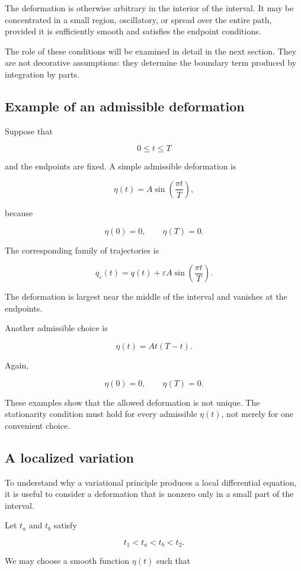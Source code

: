 The deformation is otherwise arbitrary in the interior of the interval. It may be concentrated in a small region, oscillatory, or spread over the entire path, provided it is sufficiently smooth and satisfies the endpoint conditions.

The role of these conditions will be examined in detail in the next section. They are not decorative assumptions: they determine the boundary term produced by integration by parts.

\subsection{Example of an admissible deformation}

Suppose that

\[
0\leq t\leq T
\]

and the endpoints are fixed. A simple admissible deformation is

\[
\eta(t)
=
A\sin\left(\frac{\pi t}{T}\right),
\]

because

\[
\eta(0)=0,
\qquad
\eta(T)=0.
\]

The corresponding family of trajectories is

\[
q_{\varepsilon}(t)
=
q(t)
+
\varepsilon A
\sin\left(\frac{\pi t}{T}\right).
\]

The deformation is largest near the middle of the interval and vanishes at the endpoints.

Another admissible choice is

\[
\eta(t)
=
A t(T-t).
\]

Again,

\[
\eta(0)=0,
\qquad
\eta(T)=0.
\]

These examples show that the allowed deformation is not unique. The stationarity condition must hold for every admissible \(\eta(t)\), not merely for one convenient choice.

\subsection{A localized variation}

To understand why a variational principle produces a local differential equation, it is useful to consider a deformation that is nonzero only in a small part of the interval.

Let \(t_{a}\) and \(t_{b}\) satisfy

\[
t_{1}<t_{a}<t_{b}<t_{2}.
\]

We may choose a smooth function \(\eta(t)\) such that

